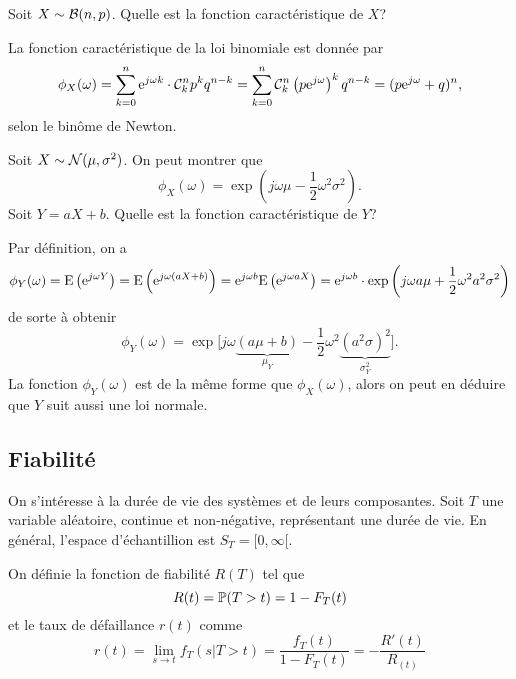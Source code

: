 \documentclass[11pt]{article}
\newcommand\comb[2]{%
	\ensuremath{%
		\mathcal{C}_{#2}^{#1}%
	}%
}%
\renewcommand\P{%
	\ensuremath{%
		\mathbb{P}%
	}%
}%
\newcommand\e{%
	\ensuremath{%
		\mathrm{e}%
	}%
}%
\newcommand\bin{%
	\ensuremath{%
		\mathcal{B}%
	}%
}%
\newcommand\Norm{%
	\ensuremath{%
		\mathcal{N}%
	}%
}%
\newcommand\Esp{%
	\ensuremath{%
		\mathrm{E}%
	}%
}%
\begin{document}
\begin{exemple}
	Soit $X\sim\bin(n,p)$. Quelle est la fonction caractéristique de $X$?

	La fonction caractéristique de la loi binomiale est donnée par
	\begin{equation*}
		\phi_X(\omega)
		=\sum_{k=0}^n\e^{j\omega k}\cdot\comb{n}{k}p^kq^{n-k}
		=\sum_{k=0}^n\comb{n}{k}\left(p\e^{j\omega}\right)^kq^{n-k}
		=(p\e^{j\omega}+q)^n,
	\end{equation*}
	selon le binôme de Newton.
\end{exemple}

\begin{exemple}
	Soit $X\sim\Norm(\mu,\sigma^2)$. On peut montrer que
	\begin{equation*}
		\phi_X(\omega)=\exp\left(j\omega\mu-\frac{1}{2}\omega^2\sigma^2\right).
	\end{equation*}
	Soit $Y=aX+b$. Quelle est la fonction caractéristique de $Y$?

	Par définition, on a
	\begin{equation*}
		\phi_Y(\omega)
		=\Esp\left(\e^{j\omega Y}\right)
		=\Esp\left(\e^{j\omega(aX+b)}\right)
		=\e^{j\omega b}\Esp\left(\e^{j\omega aX}\right)
		=\e^{j\omega b}\cdot\exp\left(j\omega a\mu+\frac{1}{2}
			\omega^2a^2\sigma^2
		\right)
	\end{equation*}
	de sorte à obtenir
	\begin{equation*}
		\phi_Y(\omega)=
		\exp\bigg[
			j\omega\underbrace{(a\mu+b)}_{\mu_Y}-
			\frac{1}{2}\omega^2\underbrace{(a^2\sigma)^2}_{\sigma_Y^2}
		\bigg].
	\end{equation*}
	La fonction $\phi_Y(\omega)$ est de la même forme que $\phi_X(\omega)$,
	alors on peut en déduire que $Y$ suit aussi une loi normale.
\end{exemple}

\subsection{Fiabilité}
On s'intéresse à la durée de vie des systèmes et de leurs composantes. Soit $T$
une variable aléatoire, continue et non-négative, représentant une durée de
vie. En général, l'espace d'échantillion est $S_T=[0,\infty[$.

On définie la fonction de fiabilité $R(T)$ tel que
\begin{equation*}
R(t)=\P(T>t)=1-F_T(t)
\end{equation*}
et le taux de défaillance $r(t)$ comme
\begin{equation*}
	r(t)
	=\lim_{s\rightarrow t}f_T(s|T>t)
	=\frac{f_T(t)}{1-F_T(t)}
	=-\frac{R\prime(t)}{R_(t)}
\end{equation*}
\end{document}

